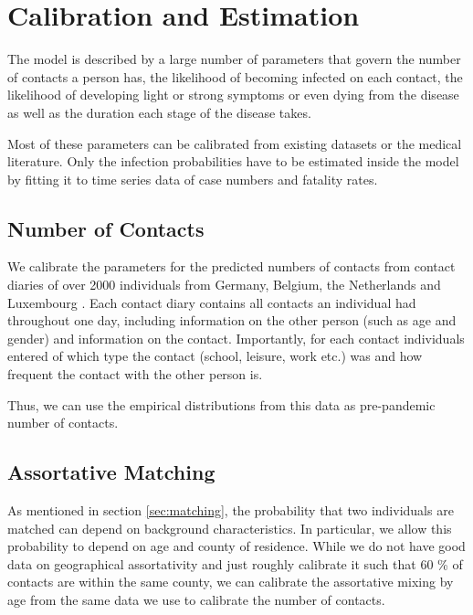 \section{Calibration and Estimation}
\label{sec:calibration_and_estimation}

The model is described by a large number of parameters that govern the number of
contacts a person has, the likelihood of becoming infected on each contact, the
likelihood of developing light or strong symptoms or even dying from the disease as well
as the duration each stage of the disease takes.

Most of these parameters can be calibrated from existing datasets or the medical
literature. Only the infection probabilities have to be estimated inside the model by
fitting it to time series data of case numbers and fatality rates.





\subsection{Number of Contacts}
\label{sub:number_of_contacts}

We calibrate the parameters for the predicted numbers of contacts from contact diaries
of over 2000 individuals from Germany, Belgium, the Netherlands and Luxembourg
\citep{Mossong2008}. Each contact diary contains all contacts an individual had
throughout one day, including information on the other person (such as age and gender)
and information on the contact. Importantly, for each contact individuals entered of
which type the contact (school, leisure, work etc.) was and how frequent the contact
with the other person is.

Thus, we can use the empirical distributions from this data as pre-pandemic number of
contacts.


\FloatBarrier


\subsection{Assortative Matching}

As mentioned in section \ref{sec:matching}, the probability that two individuals are
matched can depend on background characteristics. In particular, we allow this
probability to depend on age and county of residence. While we do not have good data on
geographical assortativity and just roughly calibrate it such that 60 \% of contacts are
within the same county, we can calibrate the assortative mixing by age from the same
data we use to calibrate the number of contacts.

